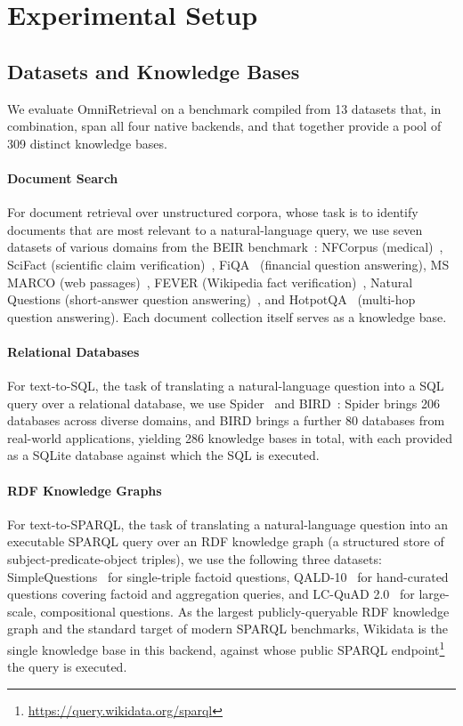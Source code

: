 \documentclass{llmxive}
\begin{document}
\section{Experimental Setup}

\subsection{Datasets and Knowledge Bases}

We evaluate OmniRetrieval on a benchmark compiled from 13 datasets that, in combination, span all four native backends, and that together provide a pool of 309 distinct knowledge bases.

\vspace{-0.075in}
\paragraph{Document Search}
For document retrieval over unstructured corpora, whose task is to identify documents that are most relevant to a natural-language query, we use seven datasets of various domains from the BEIR benchmark~\citep{BEIR}: NFCorpus (medical)~\citep{NFCorpus}, SciFact (scientific claim verification)~\citep{SciFact}, FiQA~\citep{FiQA} (financial question answering), MS MARCO (web passages)~\citep{MSMARCO}, FEVER (Wikipedia fact verification)~\citep{FEVER}, Natural Questions (short-answer question answering)~\citep{NQ}, and HotpotQA~\citep{HotpotQA} (multi-hop question answering). Each document collection itself serves as a knowledge base.

\vspace{-0.075in}
\paragraph{Relational Databases}
For text-to-SQL, the task of translating a natural-language question into a SQL query over a relational database, we use Spider~\citep{Spider} and BIRD~\citep{Bird}: Spider brings 206 databases across diverse domains, and BIRD brings a further 80 databases from real-world applications, yielding 286 knowledge bases in total, with each provided as a SQLite database against which the SQL is executed.

\vspace{-0.075in}
\paragraph{RDF Knowledge Graphs}
For text-to-SPARQL, the task of translating a natural-language question into an executable SPARQL query over an RDF knowledge graph (a structured store of subject-predicate-object triples), we use the following three datasets: SimpleQuestions~\citep{SimpleQuestions} for single-triple factoid questions, QALD-10~\citep{QALD10} for hand-curated questions covering factoid and aggregation queries, and LC-QuAD 2.0~\citep{LCQuAD2} for large-scale, compositional questions. As the largest publicly-queryable RDF knowledge graph and the standard target of modern SPARQL benchmarks, Wikidata is the single knowledge base in this backend, against whose public SPARQL endpoint\footnote{\url{https://query.wikidata.org/sparql}} the query is executed.
\end{document}
